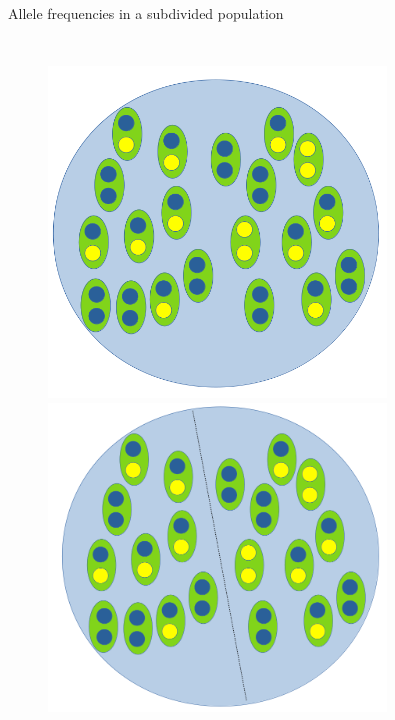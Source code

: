 \begin{frame}{Allele frequencies in a subdivided population}

        \begin{columns}


                \begin{figure}
			\includegraphics[width=0.8\textwidth]{Pics/predivision} \
                        \includegraphics[width=0.8\textwidth]{Pics/division}
                \end{figure}



\end{columns}
\end{frame}
